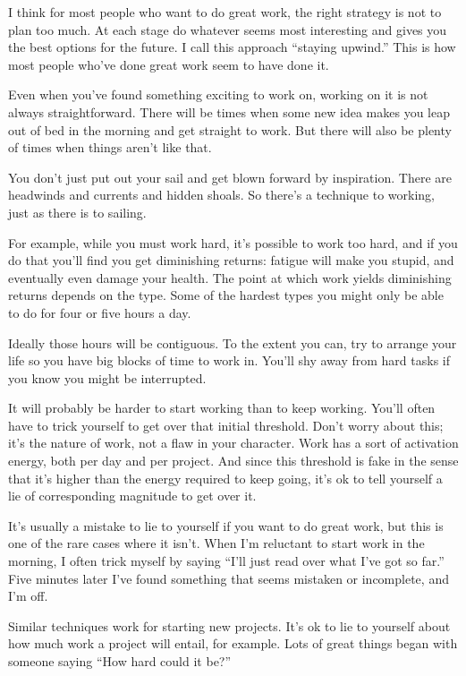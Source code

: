 I think for most people who want to do great work, the right strategy is
not to plan too much. At each stage do whatever seems most interesting
and gives you the best options for the future. I call this approach
``staying upwind.'' This is how most people who've done great work seem
to have done it.

Even when you've found something exciting to work on, working on it is
not always straightforward. There will be times when some new idea makes
you leap out of bed in the morning and get straight to work. But there
will also be plenty of times when things aren't like that.

You don't just put out your sail and get blown forward by inspiration.
There are headwinds and currents and hidden shoals. So there's a
technique to working, just as there is to sailing.

For example, while you must work hard, it's possible to work too hard,
and if you do that you'll find you get diminishing returns: fatigue will
make you stupid, and eventually even damage your health. The point at
which work yields diminishing returns depends on the type. Some of the
hardest types you might only be able to do for four or five hours a day.

Ideally those hours will be contiguous. To the extent you can, try to
arrange your life so you have big blocks of time to work in. You'll shy
away from hard tasks if you know you might be interrupted.

It will probably be harder to start working than to keep working. You'll
often have to trick yourself to get over that initial threshold. Don't
worry about this; it's the nature of work, not a flaw in your character.
Work has a sort of activation energy, both per day and per project. And
since this threshold is fake in the sense that it's higher than the
energy required to keep going, it's ok to tell yourself a lie of
corresponding magnitude to get over it.

It's usually a mistake to lie to yourself if you want to do great work,
but this is one of the rare cases where it isn't. When I'm reluctant to
start work in the morning, I often trick myself by saying ``I'll just
read over what I've got so far.'' Five minutes later I've found
something that seems mistaken or incomplete, and I'm off.

Similar techniques work for starting new projects. It's ok to lie to
yourself about how much work a project will entail, for example. Lots of
great things began with someone saying ``How hard could it be?''

